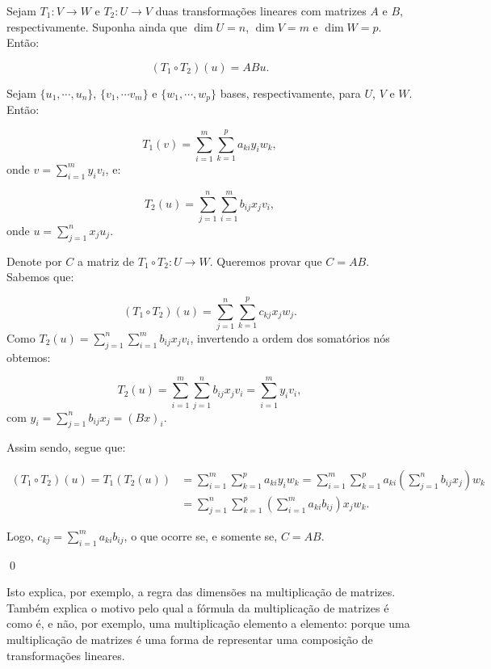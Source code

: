 \begin{Theorem}
	Sejam $T_1:V\to W$ e $T_2:U\to V$ duas transformações lineares com matrizes $A$ e $B$, respectivamente. Suponha ainda que $\dim U = n$, $\dim V = m$ e $\dim W = p$. Então:
	
	$$
	(T_1\circ T_2)(u) = ABu.
	$$
\end{Theorem}

\begin{Proof}
	Sejam $\{u_1, \cdots, u_n\}$, $\{v_1, \cdots v_m\}$ e $\{w_1, \cdots, w_p\}$ bases, respectivamente, para $U$, $V$ e $W$. Então:
	
	$$
	T_1(v) = \sum\limits_{i = 1}^{m}\sum\limits_{k = 1}^{p} a_{ki}y_iw_k,
	$$
	onde $v = \sum\limits_{i = 1}^{m} y_iv_i$, e:
	
	$$
	T_2(u) = \sum\limits_{j = 1}^{n}\sum\limits_{i = 1}^{m} b_{ij}x_jv_i,
	$$
	onde $u = \sum\limits_{j = 1}^{n} x_ju_j$.
	
	Denote por $C$ a matriz de $T_1\circ T_2: U\to W$. Queremos provar que $C = AB$. Sabemos que:
	
	$$
	(T_1\circ T_2)(u) = \sum\limits_{j = 1}^{n}\sum\limits_{k = 1}^{p} c_{kj}x_jw_j.
	$$
	Como $T_2(u) = \sum\limits_{j = 1}^{n}\sum\limits_{i = 1}^{m} b_{ij}x_jv_i$, invertendo a ordem dos somatórios nós obtemos:
	
	$$
	T_2(u) = \sum\limits_{i = 1}^{m}\sum\limits_{j = 1}^{n} b_{ij}x_jv_i = \sum\limits_{i = 1}^{m} y_iv_i,
	$$
	com $y_i = \sum\limits_{j = 1}^{n} b_{ij}x_j = (Bx)_i$.
	
	Assim sendo, segue que:
	
	\begin{align*}
		(T_1\circ T_2)(u) = T_1(T_2(u)) &= \sum\limits_{i = 1}^{m}\sum\limits_{k = 1}^{p} a_{ki}y_iw_k = \sum\limits_{i = 1}^{m}\sum\limits_{k = 1}^{p} a_{ki}\left(\sum\limits_{j = 1}^{n} b_{ij}x_j\right)w_k \\ &= \sum\limits_{j = 1}^{n}\sum\limits_{k = 1}^{p}\left(\sum\limits_{i = 1}^{m} a_{ki}b_{ij}\right) x_jw_k.
	\end{align*}
	
	Logo, $c_{kj} = \sum\limits_{i = 1}^{m}a_{ki}b_{ij}$, o que ocorre se, e somente se, $C = AB$.
	
	\qed
\end{Proof}

Isto explica, por exemplo, a regra das dimensões na multiplicação de matrizes. Também explica o motivo pelo qual a fórmula da multiplicação de matrizes é como é, e não, por exemplo, uma multiplicação elemento a elemento: porque uma multiplicação de matrizes é uma forma de representar uma composição de transformações lineares.

